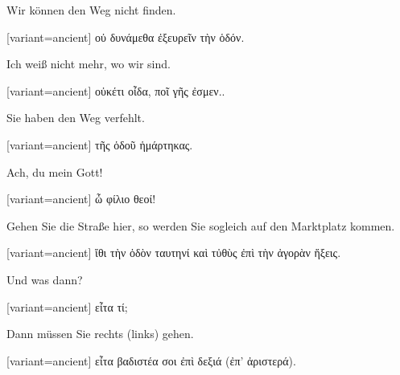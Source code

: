 Wir können den Weg nicht finden.

\switchcolumn

\begin{greek}[variant=ancient]%
οὐ δυνάμεθα ἐξευρεῖν τὴν ὁδόν.

\end{greek}%
\switchcolumn*

Ich weiß nicht mehr, wo wir sind.

\switchcolumn

\begin{greek}[variant=ancient]%
οὐκέτι οἶδα, ποῖ γῆς ἐσμεν..

\end{greek}%
\switchcolumn*

Sie haben den Weg verfehlt.

\switchcolumn

\begin{greek}[variant=ancient]%
τῆς ὁδοῦ ἡμάρτηκας.

\end{greek}%
\switchcolumn*

Ach, du mein Gott!

\switchcolumn

\begin{greek}[variant=ancient]%
ὦ φίλιο θεοί!

\end{greek}%
\switchcolumn*

Gehen Sie die Straße hier, so werden Sie sogleich auf den Marktplatz
kommen.

\switchcolumn

\begin{greek}[variant=ancient]%
ἴθι τὴν ὁδὸν ταυτηνί καὶ τὐθὺς ἐπὶ τὴν ἀγορὰν ἥξεις.

\end{greek}%
\switchcolumn*

Und was dann?

\switchcolumn

\begin{greek}[variant=ancient]%
εἶτα τί;

\end{greek}%
\switchcolumn*

Dann müssen Sie rechts (links) gehen.

\switchcolumn

\begin{greek}[variant=ancient]%
εἶτα βαδιστέα σοι ἐπὶ δεξιά (ἐπ' ἀριστερά).

\end{greek}%
\switchcolumn*


